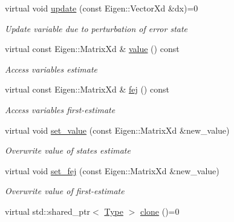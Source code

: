 \begin{DoxyCompactItemize}
virtual void \hyperlink{classov__type_1_1Type_a4e133d50af35f07bd97f73590fe31000}{update} (const Eigen\+::\+Vector\+Xd \&dx)=0
\begin{DoxyCompactList}\small\item\em Update variable due to perturbation of error state \end{DoxyCompactList}\item 
\mbox{\label{classov__type_1_1Type_a578c16c3fe70fd4a0b33c4c39c777b33}} 
virtual const Eigen\+::\+Matrix\+Xd \& \hyperlink{classov__type_1_1Type_a578c16c3fe70fd4a0b33c4c39c777b33}{value} () const
\begin{DoxyCompactList}\small\item\em Access variable\textquotesingle{}s estimate \end{DoxyCompactList}\item 
\mbox{\label{classov__type_1_1Type_a85a032ffd5c9a04bf7f582f31cdb4bb2}} 
virtual const Eigen\+::\+Matrix\+Xd \& \hyperlink{classov__type_1_1Type_a85a032ffd5c9a04bf7f582f31cdb4bb2}{fej} () const
\begin{DoxyCompactList}\small\item\em Access variable\textquotesingle{}s first-\/estimate \end{DoxyCompactList}\item 
virtual void \hyperlink{classov__type_1_1Type_a81c73f0b6c10f2550a487019a59796a9}{set\+\_\+value} (const Eigen\+::\+Matrix\+Xd \&new\+\_\+value)
\begin{DoxyCompactList}\small\item\em Overwrite value of state\textquotesingle{}s estimate \end{DoxyCompactList}\item 
virtual void \hyperlink{classov__type_1_1Type_ab8345946b27cb43e0cfc36454a06686d}{set\+\_\+fej} (const Eigen\+::\+Matrix\+Xd \&new\+\_\+value)
\begin{DoxyCompactList}\small\item\em Overwrite value of first-\/estimate \end{DoxyCompactList}\item 
\mbox{\label{classov__type_1_1Type_ab4a020332074ebad50d59427a80fefd6}} 
virtual std\+::shared\+\_\+ptr$<$ \hyperlink{classov__type_1_1Type}{Type} $>$ \hyperlink{classov__type_1_1Type_ab4a020332074ebad50d59427a80fefd6}{clone} ()=0

\end{DoxyCompactItemize}

